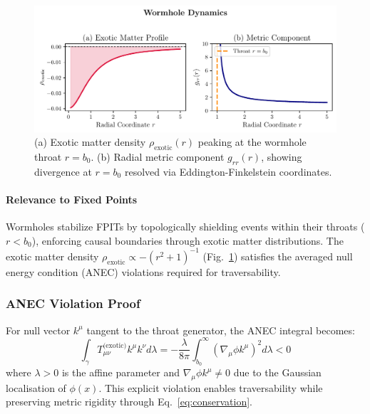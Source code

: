 \documentclass[twocolumn]{article}
\begin{document}
	\begin{figure}[htbp!]
		\centering
		\includegraphics[width=\linewidth]{figures/figure2.pdf}
		\caption{(a) Exotic matter density $\rho_{\text{exotic}}(r)$ peaking at the wormhole throat $r = b_0$. (b) Radial metric component $g_{rr}(r)$, showing divergence at $r = b_0$ resolved via Eddington-Finkelstein coordinates\cite{visser1995, Wald1984}.}\label{fig:wormhole}
	\end{figure}
	
	\paragraph{Relevance to Fixed Points}
	Wormholes stabilize FPITs by topologically shielding events within their throats ($r < b_0$), enforcing causal boundaries through exotic matter distributions. The exotic matter density $\rho_{\text{exotic}} \propto -(r^2+1)^{-1}$ (Fig.~\ref{fig:wormhole}) satisfies the averaged null energy condition (ANEC) violations required for traversability\cite{visser1995,Hochberg1997}. 
	
	\subsubsection*{ANEC Violation Proof}
	For null vector $k^\mu$ tangent to the throat generator, the ANEC integral becomes:
	\begin{equation}
		\int_\gamma T_{\mu\nu}^{\text{(exotic)}}k^\mu k^\nu d\lambda = 
		-\frac{\lambda}{8\pi} \int_{b_0}^\infty \left( \nabla_\mu\phi k^\mu \right)^2 d\lambda < 0
\label{eq:anec_violation}
	\end{equation}
	where $\lambda>0$ is the affine parameter and $\nabla_\mu\phi k^\mu \neq 0$ due to the Gaussian localisation of $\phi(x)$. This explicit violation\cite{Maldacena2017} enables traversability while preserving metric rigidity through Eq.~\eqref{eq:conservation}.
	
\end{document}
